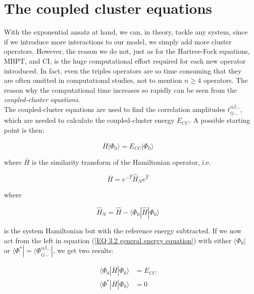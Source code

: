 	\section{The coupled cluster equations}
	With the exponential ansatz at hand, we can, in theory, tackle any system, since if we introduce more interactions to our model, we simply add more cluster operators. However, the reason we do not, just as for the Hartree-Fock equations, MBPT, and CI, is the huge computational effort required for each new operator introduced. In fact, even the triples operators are so time consuming that they are often omitted in computational studies, not to mention $n\geq 4$ operators. The reason why the computational time increases so rapidly can be seen from the \emph{coupled-cluster equations}.\\
	
	The coupled-cluster equations are used to find the correlation amplitudes $t_{ij\ldots}^{\alpha\beta\ldots}$, which are needed to calculate the coupled-cluster energy $E_{CC}$. A possible starting point is then:
	
	\begin{equation}
		\overbar{H}|\Phi_0\rangle = E_{CC}|\Phi_0\rangle
		\label{EQ 3.2 general energy equation}
	\end{equation}
	
	\noindent where $\bar{H}$ is the similarity transform of the Hamiltonian operator, i.e.
	
	\begin{equation}
		\overbar{H} = e^{-\hat{T}}\hat{H}_Ne^{\hat{T}}
	\end{equation}
	
	
	\noindent where
	
	\begin{equation}
		\hat{H}_N = \hat{H} - \langle\Phi_0|\hat{H}|\Phi_0\rangle
	\end{equation}
	
	\noindent is the system Hamiltonian but with the reference energy subtracted. If we now act from the left in equation (\ref{EQ 3.2 general energy equation}) with either $\langle\Phi_0|$ or $\langle\Phi^*| = \langle\Phi_{ij\ldots}^{\alpha\beta\ldots}|$, we get two results:
	
	\begin{align}
	\langle\Phi_0|\overbar{H}|\Phi_0\rangle &= E_{CC}
	\label{EQ 3.2 general CC equation for energy}\\
	\langle\Phi^*|\overbar{H}|\Phi_0\rangle &= 0
	\label{EQ 3.3 general CC equation for amplitudes}
	\end{align}
	
